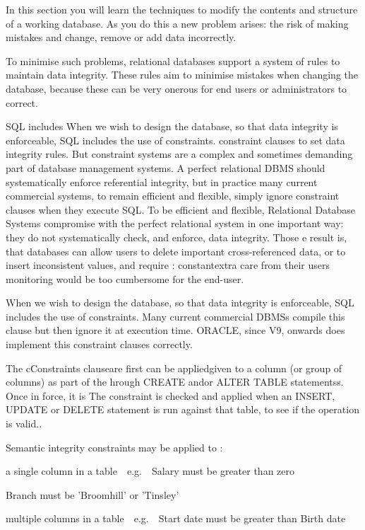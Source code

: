 In this section you will learn the techniques to modify the contents and structure of a working database. As you do this a new problem arises: the risk of making mistakes and change, remove or add data incorrectly.

To minimise such problems, relational databases support a system of rules to maintain data integrity. These rules aim to minimise mistakes when changing the database, because these can be very onerous for end users or administrators to correct.

SQL includes When we wish to design the database, so that data integrity is enforceable, SQL includes the use of constraints.   constraint clauses to set data integrity rules. But constraint systems are a complex and sometimes demanding part of database management systems. A {\textquotedbl}perfect{\textquotedbl} relational DBMS should systematically enforce referential integrity, but in practice many current commercial systems, to remain efficient and flexible, simply ignore constraint clauses when they execute SQL. To be efficient and flexible, Relational Database Systems compromise with the {\textquotedbl}perfect{\textquotedbl} relational system in one important way: they do not systematically check, and enforce, data integrity.  Those e result is, that databases can allow users to delete important cross-referenced data, or to insert inconsistent values, and require : constantextra care from their users monitoring would be too cumbersome for the end-user.

When we wish to design the database, so that data integrity is enforceable, SQL includes the use of constraints.  Many current commercial DBMSs compile this clause but then ignore it at execution time. ORACLE, since V9, onwards does implement this constraint clauses correctly.

The cConstraints clauseare first  can be appliedgiven to a column (or group of columns) as part of the hrough CREATE andor ALTER TABLE statementss. Once in force, it is  The constraint is checked and applied when an INSERT, UPDATE or DELETE statement is run against that table, to see if the operation is valid..

Semantic integrity constraints may be applied to :

a single column in a table\ \ e.g.\ \ Salary must be greater than zero

Branch must be 'Broomhill' or 'Tinsley'

multiple columns in a table\ \ e.g.\ \ Start date must be greater than Birth date

